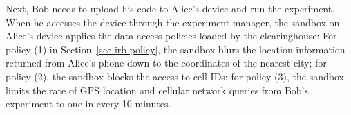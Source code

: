 Next, Bob needs to upload his code to Alice's device and 
run the experiment. When he accesses the device through
the experiment manager, the sandbox on Alice's device 
applies the data access policies loaded by the clearinghouse: For policy (1) in
Section~\ref{sec-irb-policy}, the sandbox blurs the location
information returned from Alice's phone down to the coordinates
of the nearest city; for policy (2), the sandbox blocks the
access to cell IDs; for policy (3), the sandbox limits the rate
of GPS location and cellular network queries from Bob's
experiment to one in every 10 minutes.

